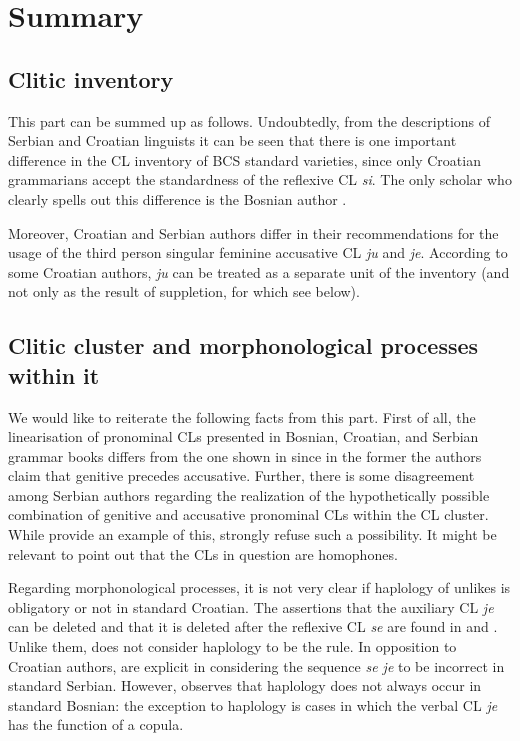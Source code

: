\section{Summary}
\subsection{Clitic inventory}

This part can be summed up as follows. Undoubtedly, from the descriptions of Serbian and Croatian linguists it can be seen that there is one important difference in the CL inventory of BCS standard varieties, since only Croatian grammarians accept the standardness of the reflexive CL \textit{si}. The only scholar who clearly spells out this difference is the Bosnian author \citet[440]{Ridjanovic12}. 

Moreover, Croatian and Serbian authors differ in their recommendations for the usage of the third person singular feminine accusative CL \textit{ju} and \textit{je}. According to some Croatian authors, \textit{ju} can be treated as a separate unit of the inventory (and not only as the result of suppletion, for which see below).

\subsection{Clitic cluster and morphonological processes within it}

We would like to reiterate the following facts from this part. First of all, the linearisation of pronominal CLs presented in Bosnian, Croatian, and Serbian grammar books differs from the one shown in \citet[29]{FranksKing00} since in the former the authors claim that genitive precedes accusative. Further, there is some disagreement among Serbian authors regarding the realization of the hypothetically possible combination of genitive and accusative pronominal CLs within the CL cluster. While \citet[451]{PiperKlajn14} provide an example of this, \citet[659]{MrazovicVukadinovic09} strongly refuse such a possibility. It might be relevant to point out that the CLs in question are homophones.

Regarding morphonological processes, it is not very clear if haplology of unlikes is obligatory or not in standard Croatian. The assertions that the auxiliary CL \textit{je} can be deleted and that it is deleted after the reflexive CL \textit{se} are found in \citet[246]{TezakBabic96} and \citet[596]{Baric97}. Unlike them, \citet[497]{Katicic86} does not consider haplology to be the rule. In opposition to Croatian authors, \citet[452]{PiperKlajn14} are explicit in considering the sequence \textit{se je} to be incorrect in standard Serbian. However, \citet{Ridjanovic12} observes that haplology does not always occur in standard Bosnian: the exception to haplology is cases in which the verbal CL \textit{je} has the function of a copula.

